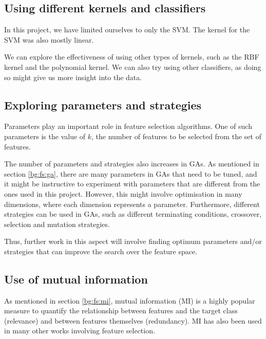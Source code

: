 \documentclass[12pt, twoside, a4paper]{report}
\begin{document}

\subsection{Using different kernels and classifiers}

In this project, we have limited ourselves to only the SVM. The kernel for the SVM was also mostly linear.

We can explore the effectiveness of using other types of kernels, such as the RBF kernel and the polynomial kernel. We can also try using other classifiers, as doing so might give us more insight into the data. 

\subsection{Exploring parameters and strategies}

Parameters play an important role in feature selection algorithms. One of such parameters is the value of $k$, the number of features to be selected from the set of features.

The number of parameters and strategies also increases in GAs. As mentioned in section \ref{bg:fs:ga}, there are many parameters in GAs that need to be tuned, and it might be instructive to experiment with parameters that are different from the ones used in this project. However, this might involve optimisation in many dimensions, where each dimension represents a parameter. Furthermore, different strategies can be used in GAs, such as different terminating conditions, crossover, selection and mutation strategies.

Thus, further work in this aspect will involve finding optimum parameters and/or strategies that can improve the search over the feature space.


\subsection{Use of mutual information} \label{extension:mi}
As mentioned in section \ref{bg:fs:mi}, mutual information (MI) is a highly popular measure to quantify the relationship between features and the target class (relevance) and between features themselves (redundancy). MI has also been used in many other works involving feature selection.
\end{document}
